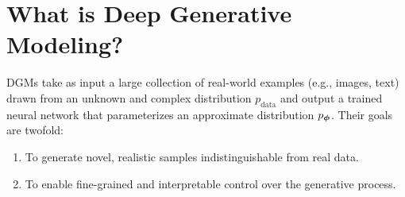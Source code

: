 




\newpage
\section{What is Deep Generative Modeling?}\label{sec:formulation-dgm}




DGMs take as input a large collection of real-world examples 
(e.g., images, text) drawn from an unknown and complex distribution $p_{\mathrm{data}}$ 
and output a trained neural network that parameterizes an approximate distribution $p_{{\bm{\phi}}}$. Their goals are twofold: 
\begin{enumerate}
\item {} To generate novel, realistic samples indistinguishable from real data.
\item {} To enable fine-grained and interpretable control over the generative process.
\end{enumerate}



